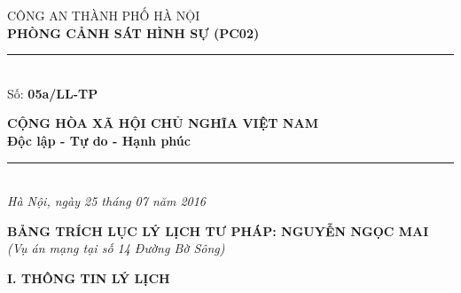 \documentclass[12pt,a4paper]{article}
\begin{document}
\noindent
\begin{minipage}[t]{0.46\textwidth}
    \begin{center}
        \fontsize{11pt}{13pt}\selectfont
        CÔNG AN THÀNH PHỐ HÀ NỘI\\
        \textbf{PHÒNG CẢNH SÁT HÌNH SỰ (PC02)}\\[-0.2em]
        \rule{3.2cm}{0.6pt}\\[0.25cm]
        \fontsize{11pt}{13pt}\selectfont Số: \textbf{05a/LL-TP}
    \end{center}
\end{minipage}
\hfill
\begin{minipage}[t]{0.52\textwidth}
    \begin{center}
        \fontsize{11pt}{13pt}\selectfont
        \textbf{CỘNG HÒA XÃ HỘI CHỦ NGHĨA VIỆT NAM}\\
        \textbf{Độc lập - Tự do - Hạnh phúc}\\[-0.2em]
        \rule{3.6cm}{0.6pt}\\[0.25cm]
        \textit{Hà Nội, ngày 25 tháng 07 năm 2016}
    \end{center}
\end{minipage}

\vspace{0.5cm}

\begin{center}
    \textbf{\Large BẢNG TRÍCH LỤC LÝ LỊCH TƯ PHÁP: NGUYỄN NGỌC MAI}\\[0.15cm]
    \textit{(Vụ án mạng tại số 14 Đường Bờ Sông)}
\end{center}

\vspace{0.3cm}



\vspace{0.3cm}\noindent\textbf{\large I. THÔNG TIN LÝ LỊCH}\\[0.15cm]
\end{document}
